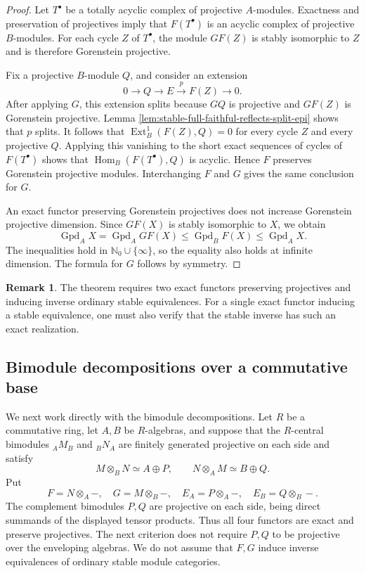\documentclass[12pt,a4paper,english,reqno]{amsart}
\numberwithin{equation}{section}
\theoremstyle{plain}
\theoremstyle{definition}
\newtheorem{remark}[theorem]{Remark}
\begin{document}
\begin{proof}
Let $T^\bullet$ be a totally acyclic complex of
projective $A$-modules.  Exactness and preservation of projectives imply
that $F(T^\bullet)$ is an acyclic complex of projective $B$-modules.
For each cycle $Z$ of $T^\bullet$, the module $GF(Z)$ is stably
isomorphic to $Z$ and is therefore Gorenstein projective.

Fix a projective $B$-module $Q$, and consider an extension
\[
 0\longrightarrow Q\longrightarrow E\xrightarrow{p}F(Z)
 \longrightarrow0.
\]
After applying $G$, this extension splits because $GQ$ is projective
and $GF(Z)$ is Gorenstein projective.  Lemma
\ref{lem:stable-full-faithful-reflects-split-epi} shows that $p$ splits.
It follows that
$\operatorname{Ext}_B^1(F(Z),Q)=0$ for every cycle $Z$ and every
projective $Q$.  Applying this vanishing to the short exact sequences
of cycles of $F(T^\bullet)$ shows that
$\operatorname{Hom}_B(F(T^\bullet),Q)$ is acyclic.  Hence $F$ preserves
Gorenstein projective modules.  Interchanging $F$ and $G$ gives the
same conclusion for $G$.

An exact functor preserving Gorenstein projectives does not increase
Gorenstein projective dimension.  Since $GF(X)$ is stably isomorphic
to $X$, we obtain
\[
 \operatorname{Gpd}_A X
 =\operatorname{Gpd}_A GF(X)
 \leq\operatorname{Gpd}_B F(X)
 \leq\operatorname{Gpd}_A X.
\]
The inequalities hold in $\mathbb N_0\cup\{\infty\}$, so the equality
also holds at infinite dimension.  The formula for $G$ follows by
symmetry.
\end{proof}

\begin{remark}
The theorem requires two exact functors preserving projectives and
inducing inverse ordinary stable equivalences.  For a single exact
functor inducing a stable equivalence, one must also verify that the
stable inverse has such an exact realization.
\end{remark}

\subsection{Bimodule decompositions over a commutative base}

We next work directly with the bimodule decompositions.  Let $R$ be a
commutative ring, let $A,B$ be $R$-algebras, and suppose that the
$R$-central bimodules $ {}_AM_B$ and $ {}_BN_A$ are finitely generated
projective on each side and satisfy
\begin{equation}
 M\otimes_BN\simeq A\oplus P,
 \qquad
 N\otimes_AM\simeq B\oplus Q.
 \label{eq:gpd-morita-decompositions}
\end{equation}
Put
\[
 F=N\otimes_A-,\quad G=M\otimes_B-,\quad
 E_A=P\otimes_A-,\quad E_B=Q\otimes_B-.
\]
The complement bimodules $P,Q$ are projective on each side, being
direct summands of the displayed tensor products.  Thus all four
functors are exact and preserve projectives.  The next criterion
does not require $P,Q$ to be projective over the enveloping algebras.
We do not assume that $F,G$ induce inverse equivalences of ordinary
stable module categories.
\end{document}
